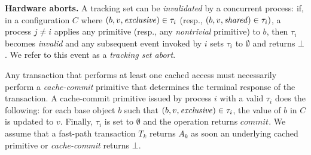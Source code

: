 %

\vspace{1mm}\noindent\textbf{Hardware aborts.}
A tracking set can be \emph{invalidated} by a concurrent process: 
if, in a configuration $C$ where  $(b,v,\mathit{exclusive})\in\tau_i$
(resp., $(b,v,\mathit{shared})\in\tau_i)$,  a process $j\neq i$ applies any primitive 
(resp., any \emph{nontrivial} primitive) to $b$, then $\tau_i$ becomes
\emph{invalid} and any subsequent event invoked by $i$
sets $\tau_i$ to $\emptyset$ and returns $\bot$. We refer to this event as a \emph{tracking set abort}.

Any transaction that performs at least one cached access must necessarily perform a \emph{cache-commit} primitive 
that determines the terminal response of the transaction.
A cache-commit primitive
issued by process $i$ with
a valid $\tau_i$ does the following: for each base object $b$ such that $(b,v,\mathit{exclusive}) \in \tau_i$, the value of $b$ in $C$ is updated to $v$. 
Finally, $\tau_i$ is set to $\emptyset$ and the operation returns $\textit{commit}$. 
We assume that a fast-path transaction $T_k$ returns $A_k$
as soon an underlying cached primitive or \emph{cache-commit} returns $\bot$.

